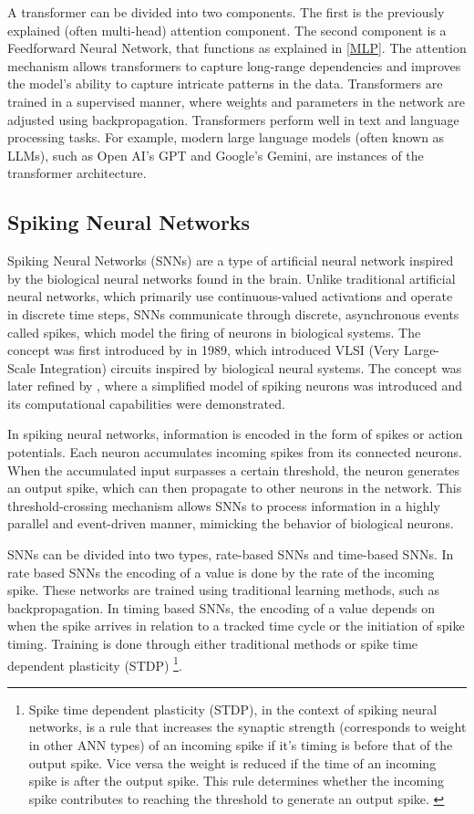 \documentclass[conference]{IEEEtran}
\begin{document}
A transformer can be divided into two components. The first is the previously explained (often multi-head) attention component. The second component is a Feedforward Neural Network, that functions as explained in \autoref{MLP}. The attention mechanism allows transformers to capture long-range dependencies and improves the model's ability to capture intricate patterns in the data. Transformers are trained in a supervised manner, where weights and parameters in the network are adjusted using backpropagation. Transformers perform well in text and language processing tasks. For example, modern large language models (often known as LLMs), such as Open AI's GPT and Google's Gemini, are instances of the transformer architecture.

\subsection{Spiking Neural Networks}
Spiking Neural Networks (SNNs) are a type of artificial neural network inspired by the biological neural networks found in the brain. Unlike traditional artificial neural networks, which primarily use continuous-valued activations and operate in discrete time steps, SNNs communicate through discrete, asynchronous events called spikes, which model the firing of neurons in biological systems. The concept was first introduced by \cite{mead2012analog} in 1989, which introduced VLSI (Very Large-Scale Integration) circuits inspired by biological neural systems. The concept was later refined by \cite{izhikevich2003simple}, where a simplified model of spiking neurons was introduced and its computational capabilities were demonstrated.

In spiking neural networks, information is encoded in the form of spikes or action potentials. Each neuron accumulates incoming spikes from its connected neurons. When the accumulated input surpasses a certain threshold, the neuron generates an output spike, which can then propagate to other neurons in the network. This threshold-crossing mechanism allows SNNs to process information in a highly parallel and event-driven manner, mimicking the behavior of biological neurons.

SNNs can be divided into two types, rate-based SNNs and time-based SNNs. In rate based SNNs the encoding of a value is done by the rate of the incoming spike. These networks are trained using traditional learning methods, such as backpropagation. In timing based SNNs, the encoding of a value depends on when the spike arrives in relation to a tracked time cycle or the initiation of spike timing. Training is done through either traditional methods or spike time dependent plasticity (STDP) \footnote{Spike time dependent plasticity (STDP), in the context of spiking neural networks, is a rule that increases the synaptic strength (corresponds to weight in other ANN types) of an incoming spike if it's timing is before that of the output spike. Vice versa the weight is reduced if the time of an incoming spike is after the output spike. This rule determines whether the incoming spike contributes to reaching the threshold to generate an output spike. \cite{bi1998synaptic}}. 
\end{document}
